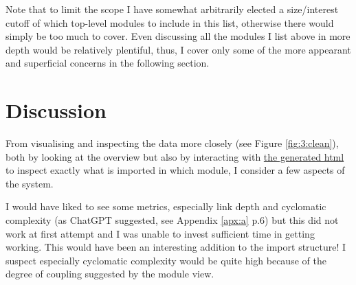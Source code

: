 \documentclass{article}
\begin{document}
Note that to limit the scope I have somewhat arbitrarily elected a size/interest cutoff
of which top-level modules to include in this list,
otherwise there would simply be too much to cover.
Even discussing all the modules I list above in more depth would be relatively plentiful,
thus, I cover only some of the more appearant and superficial concerns in the following section.


\section{Discussion}
\label{discussion}

From visualising and inspecting the data more closely (see Figure \ref{fig:3:clean}), 
both by looking at the overview but also by interacting with 
\href{https://github.com/bjarkebrodin/recovery/blob/master/top_lvl_imports.html}{the generated html}
to inspect exactly what is imported in which module,
I consider a few aspects of the system.





\vspace*{1em}
\noindent
I would have liked to see some metrics, 
especially link depth and cyclomatic complexity (as ChatGPT suggested, see Appendix \ref{apx:a} p.6) 
but this did not work at first attempt and I was unable to invest sufficient time in getting working.
This would have been an interesting addition to the import structure!
I suspect especially cyclomatic complexity would be quite high 
because of the degree of coupling suggested by the module view.
\end{document}
